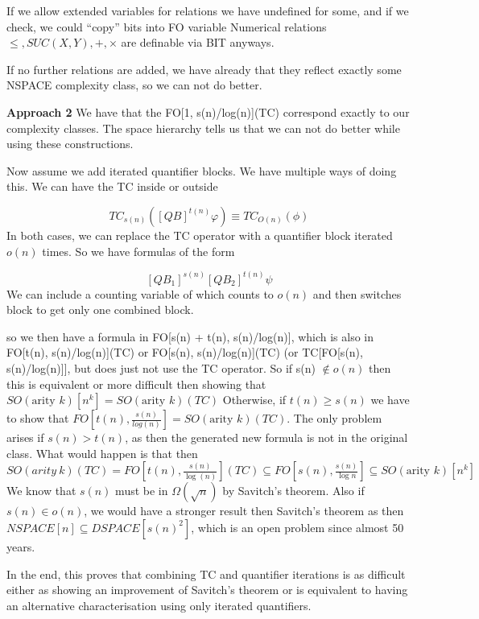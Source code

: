 If we allow extended variables for relations we have undefined for some,
and if we check, we could ``copy'' bits into FO variable Numerical
relations \(\leq, SUC(X, Y), +, \times\) are definable via BIT anyways.

If no further relations are added, we have already that they reflect
exactly some NSPACE complexity class, so we can not do better.

\textbf{Approach 2} We have that the FO{[}1, s(n)/log(n){]}(TC)
correspond exactly to our complexity classes. The space hierarchy tells
us that we can not do better while using these constructions.

Now assume we add iterated quantifier blocks. We have multiple ways of
doing this. We can have the TC inside or outside

\[
TC_{s(n)}([QB]^{t(n)}\varphi) \equiv TC_{O(n)}(\phi )
\] In both cases, we can replace the TC operator with a quantifier block
iterated \(o(n)\) times. So we have formulas of the form

\[
[QB_{1}]^{s(n)}[QB_{2}]^{t(n)} \psi
\] We can include a counting variable of which counts to \(o(n)\) and
then switches block to get only one combined block.

so we then have a formula in FO{[}s(n) + t(n), s(n)/log(n){]}, which is
also in FO{[}t(n), s(n)/log(n){]}(TC) or FO{[}s(n), s(n)/log(n){]}(TC)
(or TC{[}FO{[}s(n), s(n)/log(n){]}{]}, but does just not use the TC
operator. So if s(n) \(\not\in o(n)\) then this is equivalent or more
difficult then showing that
\(SO(\text{arity } k)[n^{k}] = SO(\text{arity } k)(TC)\) Otherwise, if
\(t(n) \geq s(n)\) we have to show that
\(FO\left[ t(n), \frac{s(n)}{log(n)} \right] = SO(\text{arity } k)(TC)\).
The only problem arises if \(s(n) > t(n)\), as then the generated new
formula is not in the original class. What would happen is that then
\(SO(arity~k)(TC) = FO\left[ t(n), \frac{s(n)}{\log(n)} \right](TC)\subseteq FO\left[ s(n), \frac{s(n)}{\log n} \right] \subseteq SO(\text{arity } k)[n^{k}]\)
We know that \(s(n)\) must be in \(\Omega(\sqrt{ n })\) by Savitch's
theorem. Also if \(s(n) \in o(n)\), we would have a stronger result then
Savitch's theorem as then \(NSPACE[n] \subseteq DSPACE[s(n)^2]\), which
is an open problem since almost 50 years.

In the end, this proves that combining TC and quantifier iterations is
as difficult either as showing an improvement of Savitch's theorem or is
equivalent to having an alternative characterisation using only iterated
quantifiers.


